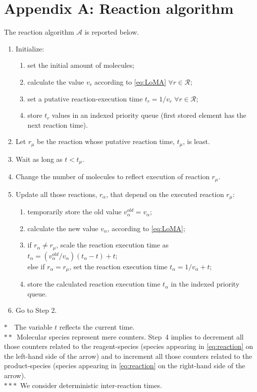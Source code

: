 \documentclass[journal]{IEEEtran}
\begin{document}
{\section*{Appendix A: Reaction algorithm}
{The reaction algorithm $\mathcal A$ is reported below.}
{
\begin{enumerate}
	\item Initialize: 
	\begin{enumerate}
			\item set the initial amount of molecules;
			\item calculate the value $v_r$ according to \eqref{eq:LoMA} $\forall r\in\mathcal{R}$; 
			\item set a putative reaction-execution time $t_r = 1/v_r$ $\forall r\in\mathcal{R}$;
			\item store $t_r$ values in an indexed priority queue (first stored element has the next reaction time). 				\end{enumerate}		
	\item Let $r_\mu$ be the reaction whose putative reaction time, $t_\mu$, is least. 
	\item Wait as long as $t<t_\mu$.
	\item Change the number of molecules to reflect execution of reaction $r_\mu$. 
	\item Update all those reactions, $r_\alpha$, that depend on the executed reaction $r_\mu$:
	\begin{enumerate}
			\item  temporarily store the old value $v_\alpha^{old}=v_\alpha$; 
			\item  calculate the new value $v_\alpha$, according to \eqref{eq:LoMA}; 
			\item if $r_ \alpha \neq r_\mu$, scale the reaction execution time as $t_\alpha = (v_\alpha^{old}/v_\alpha)(t_\alpha-t) + t$; \\
			else if $r_ \alpha = r_\mu$, set the reaction execution time $t_\alpha = 1/v_\alpha +t $; 
			\item store the calculated reaction execution time $t_\alpha$ in the indexed priority queue.
	\end{enumerate}
	\item Go to Step 2.
	\end{enumerate}
	$*$~~The variable $t$ reflects the current time.\\
	$**$~Molecular species represent mere counters. Step~4 implies to decrement all those counters related to the reagent-species (species appearing in \eqref{eq:reaction} on the left-hand side of the arrow) and to increment all those counters related to the product-species (species appearing in \eqref{eq:reaction} on the right-hand side of the arrow).\\
	$***$~We consider deterministic inter-reaction times.
}



}
\end{document}
